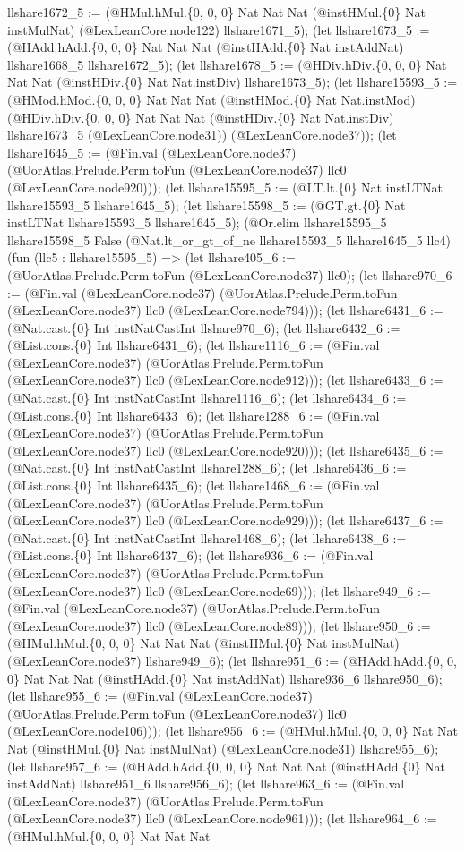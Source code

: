 \documentclass[11pt]{article}
\begin{document}
llshare1672\_5 := (@HMul.hMul.\{0, 0, 0\} Nat Nat Nat (@instHMul.\{0\} Nat instMulNat) (@LexLeanCore.node122) llshare1671\_5); (let llshare1673\_5 := (@HAdd.hAdd.\{0, 0, 0\} Nat Nat Nat (@instHAdd.\{0\} Nat instAddNat) llshare1668\_5 llshare1672\_5); (let llshare1678\_5 := (@HDiv.hDiv.\{0, 0, 0\} Nat Nat Nat (@instHDiv.\{0\} Nat Nat.instDiv) llshare1673\_5); (let llshare15593\_5 := (@HMod.hMod.\{0, 0, 0\} Nat Nat Nat (@instHMod.\{0\} Nat Nat.instMod) (@HDiv.hDiv.\{0, 0, 0\} Nat Nat Nat (@instHDiv.\{0\} Nat Nat.instDiv) llshare1673\_5 (@LexLeanCore.node31)) (@LexLeanCore.node37)); (let llshare1645\_5 := (@Fin.val (@LexLeanCore.node37) (@UorAtlas.Prelude.Perm.toFun (@LexLeanCore.node37) llc0 (@LexLeanCore.node920))); (let llshare15595\_5 := (@LT.lt.\{0\} Nat instLTNat llshare15593\_5 llshare1645\_5); (let llshare15598\_5 := (@GT.gt.\{0\} Nat instLTNat llshare15593\_5 llshare1645\_5); (@Or.elim llshare15595\_5 llshare15598\_5 False (@Nat.lt\_or\_gt\_of\_ne llshare15593\_5 llshare1645\_5 llc4) (fun (llc5 : llshare15595\_5) => (let llshare405\_6 := (@UorAtlas.Prelude.Perm.toFun (@LexLeanCore.node37) llc0); (let llshare970\_6 := (@Fin.val (@LexLeanCore.node37) (@UorAtlas.Prelude.Perm.toFun (@LexLeanCore.node37) llc0 (@LexLeanCore.node794))); (let llshare6431\_6 := (@Nat.cast.\{0\} Int instNatCastInt llshare970\_6); (let llshare6432\_6 := (@List.cons.\{0\} Int llshare6431\_6); (let llshare1116\_6 := (@Fin.val (@LexLeanCore.node37) (@UorAtlas.Prelude.Perm.toFun (@LexLeanCore.node37) llc0 (@LexLeanCore.node912))); (let llshare6433\_6 := (@Nat.cast.\{0\} Int instNatCastInt llshare1116\_6); (let llshare6434\_6 := (@List.cons.\{0\} Int llshare6433\_6); (let llshare1288\_6 := (@Fin.val (@LexLeanCore.node37) (@UorAtlas.Prelude.Perm.toFun (@LexLeanCore.node37) llc0 (@LexLeanCore.node920))); (let llshare6435\_6 := (@Nat.cast.\{0\} Int instNatCastInt llshare1288\_6); (let llshare6436\_6 := (@List.cons.\{0\} Int llshare6435\_6); (let llshare1468\_6 := (@Fin.val (@LexLeanCore.node37) (@UorAtlas.Prelude.Perm.toFun (@LexLeanCore.node37) llc0 (@LexLeanCore.node929))); (let llshare6437\_6 := (@Nat.cast.\{0\} Int instNatCastInt llshare1468\_6); (let llshare6438\_6 := (@List.cons.\{0\} Int llshare6437\_6); (let llshare936\_6 := (@Fin.val (@LexLeanCore.node37) (@UorAtlas.Prelude.Perm.toFun (@LexLeanCore.node37) llc0 (@LexLeanCore.node69))); (let llshare949\_6 := (@Fin.val (@LexLeanCore.node37) (@UorAtlas.Prelude.Perm.toFun (@LexLeanCore.node37) llc0 (@LexLeanCore.node89))); (let llshare950\_6 := (@HMul.hMul.\{0, 0, 0\} Nat Nat Nat (@instHMul.\{0\} Nat instMulNat) (@LexLeanCore.node37) llshare949\_6); (let llshare951\_6 := (@HAdd.hAdd.\{0, 0, 0\} Nat Nat Nat (@instHAdd.\{0\} Nat instAddNat) llshare936\_6 llshare950\_6); (let llshare955\_6 := (@Fin.val (@LexLeanCore.node37) (@UorAtlas.Prelude.Perm.toFun (@LexLeanCore.node37) llc0 (@LexLeanCore.node106))); (let llshare956\_6 := (@HMul.hMul.\{0, 0, 0\} Nat Nat Nat (@instHMul.\{0\} Nat instMulNat) (@LexLeanCore.node31) llshare955\_6); (let llshare957\_6 := (@HAdd.hAdd.\{0, 0, 0\} Nat Nat Nat (@instHAdd.\{0\} Nat instAddNat) llshare951\_6 llshare956\_6); (let llshare963\_6 := (@Fin.val (@LexLeanCore.node37) (@UorAtlas.Prelude.Perm.toFun (@LexLeanCore.node37) llc0 (@LexLeanCore.node961))); (let llshare964\_6 := (@HMul.hMul.\{0, 0, 0\} Nat Nat Nat 
\end{document}

